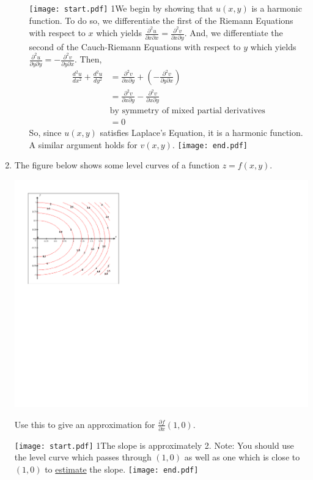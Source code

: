 \documentclass[12pt]{article}
\begin{document}
\begin{enumerate}
\begin{enumerate}
\texttt{[image: start.pdf]}
{{{1\linewidth}{We begin by showing that $u(x,y)$ is a harmonic function.  To do so, we differentiate the first of the Riemann Equations with respect to $x$ which yields $\frac{\partial^2 u}{\partial x \partial x}=\frac{\partial^2 v}{\partial x\partial y}$.  And, we differentiate the second of the Cauch-Riemann Equations with respect to $y$ which yields $\frac{\partial^2 u}{\partial y \partial y}=-\frac{\partial^2 v}{\partial y \partial x}$.  Then,
\begin{align*}
\frac{d^2u}{dx^2}+\frac{d^2u}{dy^2} & = \frac{\partial^2 v}{\partial x\partial y}+\left(-\frac{\partial^2 v}{\partial y \partial x}\right)\\
&=\frac{\partial^2 v}{\partial x\partial y}-\frac{\partial^2 v}{\partial x\partial y}\\
&\text{by symmetry of mixed partial derivatives}\\
&=0
\end{align*}
So, since $u(x,y)$ satisfies Laplace's Equation, it is a harmonic function.  A similar argument holds for $v(x,y)$.}}}
\texttt{[image: end.pdf]}



\end{enumerate}

\item The figure below shows some level curves of a function $z=f(x,y)$.

\begin{center}
\includegraphics[scale=1]{contour.pdf}
\end{center}

Use this to give an approximation for $\frac{\partial f}{\partial x}(1,0)$.

\texttt{[image: start.pdf]}
{{{1\linewidth}{The slope is approximately 2.  Note: You should use the level curve which passes through $(1,0)$ as well as one which is close to $(1,0)$ to \underline{estimate} the slope.}}}
\texttt{[image: end.pdf]}


\end{enumerate}
\end{document}

